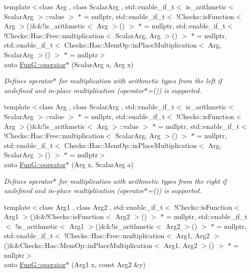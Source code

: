 \begin{DoxyCompactItemize}
{\footnotesize template$<$class Arg , class Scalar\+Arg , std\+::enable\+\_\+if\+\_\+t$<$ is\+\_\+arithmetic$<$ Scalar\+Arg $>$\+::value $>$ $\ast$  = nullptr, std\+::enable\+\_\+if\+\_\+t$<$ !\+Checks\+::is\+Function$<$ Arg $>$()\&\&!is\+\_\+arithmetic$<$ Arg $>$() $>$ $\ast$  = nullptr, std\+::enable\+\_\+if\+\_\+t$<$ !\+Checks\+::\+Has\+::\+Free\+::multiplication$<$ Scalar\+Arg, Arg $>$() $>$ $\ast$  = nullptr, std\+::enable\+\_\+if\+\_\+t$<$ Checks\+::\+Has\+::\+Mem\+Op\+::in\+Place\+Multiplication$<$ Arg, Scalar\+Arg $>$() $>$ $\ast$  = nullptr$>$ }\\auto \hyperlink{namespaceFunG_ac71b238827eda3b6518c39e49447bdeb}{Fun\+G\+::operator$\ast$} (Scalar\+Arg a, Arg x)
\begin{DoxyCompactList}\small\item\em Defines operator$\ast$ for multiplication with arithmetic types from the left if undefined and in-\/place multiplication (operator$\ast$=()) is supported. \end{DoxyCompactList}\item 
{\footnotesize template$<$class Arg , class Scalar\+Arg , std\+::enable\+\_\+if\+\_\+t$<$ is\+\_\+arithmetic$<$ Scalar\+Arg $>$\+::value $>$ $\ast$  = nullptr, std\+::enable\+\_\+if\+\_\+t$<$ !\+Checks\+::is\+Function$<$ Arg $>$()\&\&!is\+\_\+arithmetic$<$ Arg $>$\+::value $>$ $\ast$  = nullptr, std\+::enable\+\_\+if\+\_\+t$<$ !\+Checks\+::\+Has\+::\+Free\+::multiplication$<$ Scalar\+Arg, Arg $>$() $>$ $\ast$  = nullptr, std\+::enable\+\_\+if\+\_\+t$<$ Checks\+::\+Has\+::\+Mem\+Op\+::in\+Place\+Multiplication$<$ Arg, Scalar\+Arg $>$() $>$ $\ast$  = nullptr$>$ }\\auto \hyperlink{namespaceFunG_a49623beb215912a02388a11cc18f15fe}{Fun\+G\+::operator$\ast$} (Arg x, Scalar\+Arg a)
\begin{DoxyCompactList}\small\item\em Defines operator$\ast$ for multiplication with arithmetic types from the right if undefined and in-\/place multiplication (operator$\ast$=()) is supported. \end{DoxyCompactList}\item 
{\footnotesize template$<$class Arg1 , class Arg2 , std\+::enable\+\_\+if\+\_\+t$<$ !\+Checks\+::is\+Function$<$ Arg1 $>$()\&\&!\+Checks\+::is\+Function$<$ Arg2 $>$() $>$ $\ast$  = nullptr, std\+::enable\+\_\+if\+\_\+t$<$ !is\+\_\+arithmetic$<$ Arg1 $>$()\&\&!is\+\_\+arithmetic$<$ Arg2 $>$() $>$ $\ast$  = nullptr, std\+::enable\+\_\+if\+\_\+t$<$ !\+Checks\+::\+Has\+::\+Free\+::multiplication$<$ Arg1, Arg2 $>$()\&\&\+Checks\+::\+Has\+::\+Mem\+Op\+::in\+Place\+Multiplication$<$ Arg1, Arg2 $>$() $>$ $\ast$  = nullptr$>$ }\\auto \hyperlink{namespaceFunG_ad023f2d2273af693f2b4ebceeb296dc8}{Fun\+G\+::operator$\ast$} (Arg1 x, const Arg2 \&y)

\end{DoxyCompactItemize}
